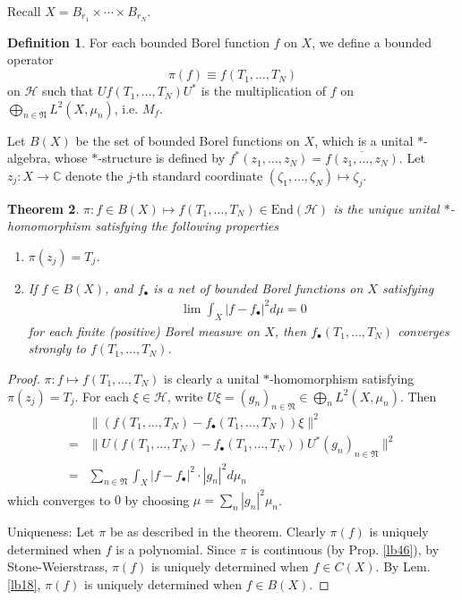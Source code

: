 \documentclass[12pt,b5paper,notitlepage]{article}
\theoremstyle{definition}
\newtheorem{df}{Definition}[section]
\theoremstyle{plain}
\newtheorem{thm}[df]{Theorem}
\newcommand{\fk}{\mathfrak}
\newcommand{\mc}{\mathcal}
\newcommand{\ovl}{\overline}
\newcommand{\End}{\mathrm{End}} %
\newcommand{\blt}{\bullet}
\newcommand{\Cbb}{\mathbb C}
\numberwithin{equation}{section}
\begin{document}
Recall $X=B_{r_1}\times\cdots\times B_{r_N}$.

\begin{df}\label{lb58}
For each bounded Borel function $f$ on $X$, we define a bounded operator $$\pi(f)\equiv f(T_1,\dots,T_N)$$ on $\mc H$ such that $Uf(T_1,\dots,T_N)U^*$ is the multiplication of $f$ on $\bigoplus_{n\in\fk N} L^2(X,\mu_n)$, i.e. $M_f$.
\end{df}

Let $B(X)$ be the set of bounded Borel functions on $X$, which is a unital $*$-algebra, whose $*$-structure is defined by $f^*(z_1,\dots,z_N)=\ovl{f(z_1,\dots,z_N)}$. Let $z_j:X\rightarrow\Cbb$ denote the $j$-th standard coordinate $(\zeta_1,\dots,\zeta_N)\mapsto \zeta_j$.

\begin{thm}\label{lb28}
$\pi:f\in B(X)\mapsto f(T_1,\dots,T_N)\in\End(\mc H)$ is the unique unital $*$-homomorphism satisfying the following properties
\begin{enumerate}
\item $\pi(z_j)=T_j$.
\item If $f\in B(X)$, and $f_\blt$ is a net of bounded Borel functions on $X$ satisfying
\begin{align*}
\lim \int_X|f-f_\blt|^2d\mu=0
\end{align*}
for each finite (positive) Borel measure on $X$, then $f_\blt(T_1,\dots,T_N)$ converges strongly to $f(T_1,\dots,T_N)$.
\end{enumerate}
\end{thm}

\begin{proof}
$\pi:f\mapsto f(T_1,\dots,T_N)$ is clearly a unital $*$-homomorphism satisfying $\pi(z_j)=T_j$. For each $\xi\in\mc H$, write $U\xi=(g_n)_{n\in\fk N}\in\bigoplus_n L^2(X,\mu_n)$. Then
\begin{align*}
&\lVert (f(T_1,\dots,T_N)-f_\blt(T_1,\dots,T_N))\xi\lVert^2\\
=&	\lVert U(f(T_1,\dots,T_N)-f_\blt(T_1,\dots,T_N))U^*(g_n)_{n\in\fk N}\lVert^2\\
=&\sum_{n\in\fk N}\int_X |f-f_\blt|^2\cdot |g_n|^2d\mu_n
\end{align*}	
which converges to $0$ by choosing $\mu=\sum_n |g_n|^2\mu_n$.



Uniqueness: Let $\pi$ be as described in the theorem. Clearly $\pi(f)$ is uniquely determined when $f$ is a polynomial. Since $\pi$ is continuous (by Prop. \ref{lb46}), by Stone-Weierstrass, $\pi(f)$ is uniquely determined when $f\in C(X)$. By Lem. \ref{lb18}, $\pi(f)$ is uniquely determined when $f\in B(X)$. 
\end{proof}
\end{document}
